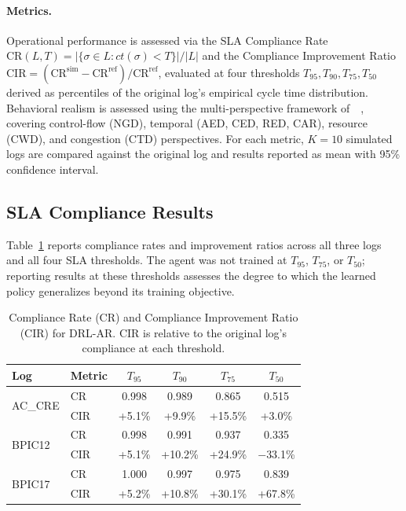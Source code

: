 \documentclass[runningheads]{llncs}
\begin{document}
\vspace{-2em} %
\paragraph{Metrics.}
Operational performance is assessed via the SLA Compliance Rate 
$\mathrm{CR}(L,T)=|\{\sigma\in L:ct(\sigma)<T\}|/|L|$ and the 
Compliance Improvement Ratio 
$\mathrm{CIR}=(\mathrm{CR}^{\mathrm{sim}}-\mathrm{CR}^{\mathrm{ref}})/
\mathrm{CR}^{\mathrm{ref}}$, evaluated at four thresholds 
$T_{95},T_{90},T_{75},T_{50}$ derived as percentiles of the 
original log's empirical cycle time distribution. Behavioral 
realism is assessed using the multi-perspective framework 
of~\citeauthor{framework_for_measuring_the_quality_of_business_process_simulation_models}~\cite{framework_for_measuring_the_quality_of_business_process_simulation_models},
covering control-flow (NGD), temporal (AED, CED, RED, CAR), resource 
(CWD), and congestion (CTD) perspectives. For each metric, 
$K=10$ simulated logs are compared against the original log and 
results reported as mean with 95\% confidence interval.

\subsection{SLA Compliance Results}
\label{subsec:compliance}

Table~\ref{tab:compliance} reports compliance rates and improvement 
ratios across all three logs and all four SLA thresholds. The agent 
was not trained at $T_{95}$, $T_{75}$, or $T_{50}$; reporting 
results at these thresholds assesses the degree to which the 
learned policy generalizes beyond its training objective.
%
\begin{table}[!ht]
\centering
\small
\renewcommand{\arraystretch}{1.1}
\begin{tabular}{llcccc}
\hline
\textbf{Log} & \textbf{Metric} & $T_{95}$ & $T_{90}$ & 
$T_{75}$ & $T_{50}$ \\
\hline
\multirow{2}{*}{AC\_CRE}
  & CR  & 0.998 & 0.989 & 0.865 & 0.515 \\
  & CIR & +5.1\% & +9.9\% & +15.5\% & +3.0\% \\
\hline
\multirow{2}{*}{BPIC12}
  & CR  & 0.998 & 0.991 & 0.937 & 0.335 \\
  & CIR & +5.1\% & +10.2\% & +24.9\% & $-$33.1\% \\
\hline
\multirow{2}{*}{BPIC17}
  & CR  & 1.000 & 0.997 & 0.975 & 0.839 \\
  & CIR & +5.2\% & +10.8\% & +30.1\% & +67.8\% \\
\hline
\end{tabular}
\caption{Compliance Rate (CR) and Compliance Improvement Ratio 
(CIR) for DRL-AR. CIR is relative to the original log's compliance at each threshold.}
\label{tab:compliance}
\end{table}
\end{document}
